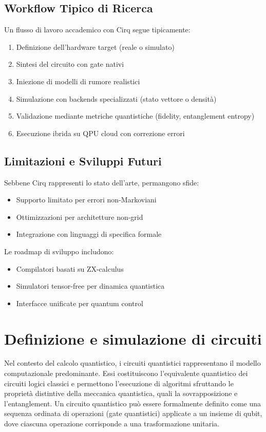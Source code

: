 \documentclass[a4paper,12pt]{report}
\theoremstyle{plain}
\begin{document}
\subsection{Workflow Tipico di Ricerca}
\label{subsec:cirq-workflow}

Un flusso di lavoro accademico con Cirq segue tipicamente:
\begin{enumerate}
    \item Definizione dell'hardware target (reale o simulato)
    \item Sintesi del circuito con gate nativi
    \item Iniezione di modelli di rumore realistici
    \item Simulazione con backends specializzati (stato vettore o densità)
    \item Validazione mediante metriche quantistiche (fidelity, entanglement entropy)
    \item Esecuzione ibrida su QPU cloud con correzione errori
\end{enumerate}

\subsection{Limitazioni e Sviluppi Futuri}
\label{subsec:cirq-future}

Sebbene Cirq rappresenti lo stato dell'arte, permangono sfide:
\begin{itemize}
    \item Supporto limitato per errori non-Markoviani
    \item Ottimizzazioni per architetture non-grid
    \item Integrazione con linguaggi di specifica formale
\end{itemize}

Le roadmap di sviluppo includono:
\begin{itemize}
    \item Compilatori basati su ZX-calculus
    \item Simulatori tensor-free per dinamica quantistica
    \item Interfacce unificate per quantum control
\end{itemize}
\section{Definizione e simulazione di circuiti}

Nel contesto del calcolo quantistico, i circuiti quantistici rappresentano il modello computazionale predominante. Essi costituiscono l'equivalente quantistico dei circuiti logici classici e permettono l'esecuzione di algoritmi sfruttando le proprietà distintive della meccanica quantistica, quali la sovrapposizione e l'entanglement. Un circuito quantistico può essere formalmente definito come una sequenza ordinata di operazioni (gate quantistici) applicate a un insieme di qubit, dove ciascuna operazione corrisponde a una trasformazione unitaria.
\end{document}
